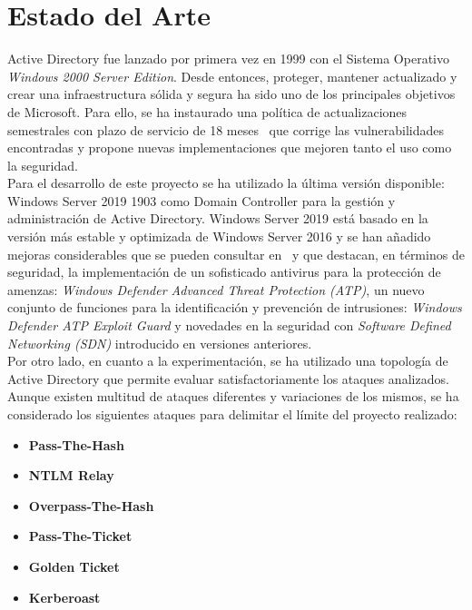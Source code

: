 \section{Estado del Arte}

Active Directory fue lanzado por primera vez en 1999 con el Sistema Operativo {\it Windows 2000 Server Edition}. Desde entonces, proteger, mantener actualizado y crear una infraestructura sólida y segura ha sido uno de los principales objetivos de Microsoft. Para ello, se ha instaurado una política de actualizaciones semestrales con plazo de servicio de 18 meses~\cite{Capitulo1:Update} que corrige las vulnerabilidades encontradas y propone nuevas implementaciones que mejoren tanto el uso como la seguridad.\\

Para el desarrollo de este proyecto se ha utilizado la última versión disponible: Windows Server 2019 1903 como Domain Controller para la gestión y administración de Active Directory. Windows Server 2019 está basado en la versión más estable y optimizada de Windows Server 2016 y se han añadido mejoras considerables que se pueden consultar en~\cite{Capitulo1:WindowsServer2019} y que destacan, en términos de seguridad, la implementación de un sofisticado antivirus para la protección de amenzas: {\it Windows Defender Advanced Threat Protection (ATP)}, un nuevo conjunto de funciones para la identificación y prevención de intrusiones: {\it Windows Defender ATP Exploit Guard} y novedades en la seguridad con {\it Software Defined Networking (SDN)} introducido en versiones anteriores. \\

Por otro lado, en cuanto a la experimentación, se ha utilizado una topología de Active Directory que permite evaluar satisfactoriamente los ataques analizados. Aunque existen multitud de ataques diferentes y variaciones de los mismos, se ha considerado los siguientes ataques para delimitar el límite del proyecto realizado: 

\begin{itemize}
\item \textbf{Pass-The-Hash}
\item \textbf{NTLM Relay}
\item \textbf{Overpass-The-Hash}
\item \textbf{Pass-The-Ticket}
\item \textbf{Golden Ticket}
\item \textbf{Kerberoast}
\end{itemize}

